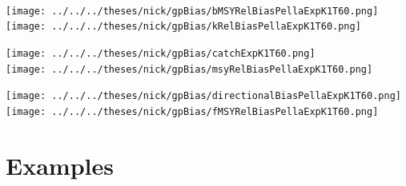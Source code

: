 \documentclass[ xcolor = pdftex, dvipsnames, table ]{beamer}
\begin{document}
%
\begin{frame}%
$~$
\hspace*{-1.25cm}
\begin{minipage}[h!]{0.33\textwidth}
\hspace*{0.25cm}
\texttt{[image: ../../../theses/nick/gpBias/bMSYRelBiasPellaExpK1T60.png]}\\
\hspace*{0.25cm}
\texttt{[image: ../../../theses/nick/gpBias/kRelBiasPellaExpK1T60.png]}
\end{minipage}
\begin{minipage}[h!]{0.33\textwidth}
\hspace*{0.75cm}
\texttt{[image: ../../../theses/nick/gpBias/catchExpK1T60.png]}\\
\hspace*{0.75cm}
\texttt{[image: ../../../theses/nick/gpBias/msyRelBiasPellaExpK1T60.png]}
\end{minipage}
\begin{minipage}[h!]{0.33\textwidth}
\hspace*{1cm}
\texttt{[image: ../../../theses/nick/gpBias/directionalBiasPellaExpK1T60.png]}\\
\hspace*{1cm}
\texttt{[image: ../../../theses/nick/gpBias/fMSYRelBiasPellaExpK1T60.png]}
\end{minipage}
\end{frame}


%
\section{Examples}
\subsection{}
\end{document}
